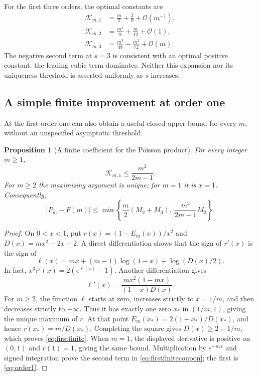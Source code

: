 \documentclass[11pt,a4paper]{article}
\newtheorem{proposition}[theorem]{Proposition}
\theoremstyle{definition}
\newcommand{\bigO}{\mathcal O}
\newcommand{\Kopt}{\mathcal K}
\begin{document}
For the first three orders, the optimal constants are
\begin{align*}
 \Kopt_{m,1}&=\frac m2+\frac29+\bigO(m^{-1}),\\
 \Kopt_{m,2}&=\frac{m^2}8+\frac m{12}+\bigO(1),\\
 \Kopt_{m,3}&=\frac{m^3}{48}-\frac{m^2}{72}+\bigO(m).
\end{align*}
The negative second term at $s=3$ is consistent with an optimal positive
constant: the leading cubic term dominates. Neither this expansion nor
its uniqueness threshold is asserted uniformly as $s$ increases.

\subsection{A simple finite improvement at order one}

At the first order one can also obtain a useful closed upper bound for
every $m$, without an unspecified asymptotic threshold.

\begin{proposition}[A finite coefficient for the Poisson product]\label{prop:firstfinite}
For every integer $m\ge1$,
\begin{equation}\label{eq:firstfinite}
 \Kopt_{m,1}\le\frac{m^2}{2m-1}.
\end{equation}
For $m\ge2$ the maximizing argument is unique; for $m=1$ it is $x=1$.
Consequently,
\begin{equation}\label{eq:firstfinitecoupon}
 |P_m-F(m)|\le
 \min\left\{\frac m2(M_2+M_3),\
              \frac{m^2}{2m-1}M_2\right\}.
\end{equation}
\end{proposition}
\begin{proof}
On $0<x<1$, put $r(x)=(1-E_m(x))/x^2$ and
$D(x)=mx^2-2x+2$. A direct differentiation shows that the sign of
$r'(x)$ is the sign of
\[
 \ell(x)=mx+(m-1)\log(1-x)+\log(D(x)/2).
\]
In fact, $x^3r'(x)=2(e^{\ell(x)}-1)$. Another differentiation gives
\[
 \ell'(x)=\frac{mx^2(1-mx)}{(1-x)D(x)}.
\]
For $m\ge2$, the function $\ell$ starts at zero, increases strictly
to $x=1/m$, and then decreases strictly to $-\infty$. Thus it has
exactly one zero $x_*$ in $(1/m,1)$, giving the unique maximum of $r$.
At that point $E_m(x_*)=2(1-x_*)/D(x_*)$, and hence
$r(x_*)=m/D(x_*)$. Completing the square gives
$D(x)\ge2-1/m$, which proves \eqref{eq:firstfinite}.
When $m=1$, the displayed derivative is positive on $(0,1)$ and
$r(1)=1$, giving the same bound. Multiplication by $e^{-mx}$ and
signed integration prove the second term in \eqref{eq:firstfinitecoupon};
the first is \eqref{eq:order1}.
\end{proof}
\end{document}
